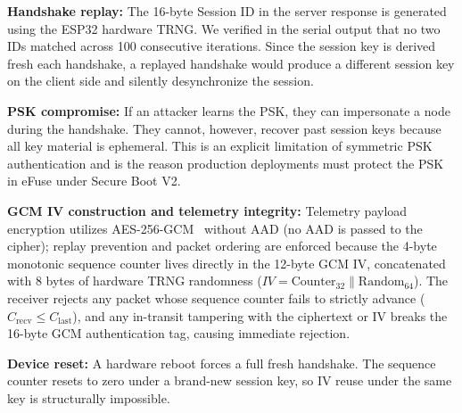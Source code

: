 \documentclass[journal, 10pt]{IEEEtran}
\begin{document}
\textbf{Handshake replay:} The 16-byte Session ID in the server response is generated using the ESP32 hardware TRNG. We verified in the serial output that no two IDs matched across 100 consecutive iterations. Since the session key is derived fresh each handshake, a replayed handshake would produce a different session key on the client side and silently desynchronize the session.

\textbf{PSK compromise:} If an attacker learns the PSK, they can impersonate a node during the handshake. They cannot, however, recover past session keys because all key material is ephemeral. This is an explicit limitation of symmetric PSK authentication and is the reason production deployments must protect the PSK in eFuse under Secure Boot V2.

\textbf{GCM IV construction and telemetry integrity:} Telemetry payload encryption utilizes AES-256-GCM~\cite{b22,b29,b35} without AAD (no AAD is passed to the cipher); replay prevention and packet ordering are enforced because the 4-byte monotonic sequence counter lives directly in the 12-byte GCM IV, concatenated with 8 bytes of hardware TRNG randomness ($IV = \text{Counter}_{32} \parallel \text{Random}_{64}$). The receiver rejects any packet whose sequence counter fails to strictly advance ($C_{\text{recv}} \leq C_{\text{last}}$), and any in-transit tampering with the ciphertext or IV breaks the 16-byte GCM authentication tag, causing immediate rejection.

\textbf{Device reset:} A hardware reboot forces a full fresh handshake. The sequence counter resets to zero under a brand-new session key, so IV reuse under the same key is structurally impossible.
\end{document}
